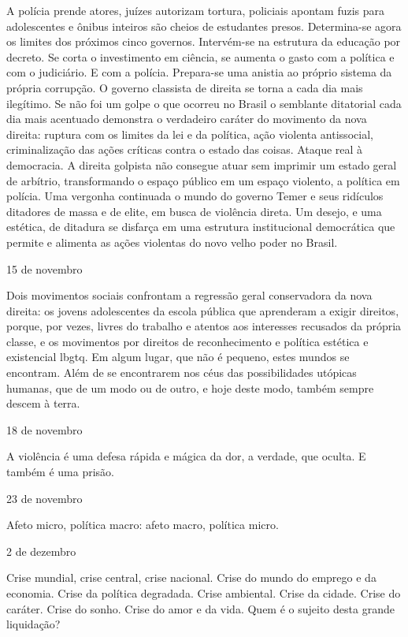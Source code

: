 A polícia prende atores, juízes autorizam tortura, policiais apontam
fuzis para adolescentes e ônibus inteiros são cheios de estudantes
presos. Determina-se agora os limites dos próximos cinco governos.
Intervém-se na estrutura da educação por decreto. Se corta o
investimento em ciência, se aumenta o gasto com a política e com o
judiciário. E com a polícia. Prepara-se uma anistia ao próprio sistema
da própria corrupção. O governo classista de direita se torna a cada dia
mais ilegítimo. Se não foi um golpe o que ocorreu no Brasil o semblante
ditatorial cada dia mais acentuado demonstra o verdadeiro caráter do
movimento da nova direita: ruptura com os limites da lei e da política,
ação violenta antissocial, criminalização das ações críticas contra o
estado das coisas. Ataque real à democracia. A direita golpista não
consegue atuar sem imprimir um estado geral de arbítrio, transformando o
espaço público em um espaço violento, a política em polícia. Uma
vergonha continuada o mundo do governo Temer e seus ridículos ditadores
de massa e de elite, em busca de violência direta. Um desejo, e uma
estética, de ditadura se disfarça em uma estrutura institucional
democrática que permite e alimenta as ações violentas do novo velho
poder no Brasil.

15 de novembro

Dois movimentos sociais confrontam a regressão geral conservadora da
nova direita: os jovens adolescentes da escola pública que aprenderam a
exigir direitos, porque, por vezes, livres do trabalho e atentos aos
interesses recusados da própria classe, e os movimentos por direitos de
reconhecimento e política estética e existencial lbgtq. Em algum lugar,
que não é pequeno, estes mundos se encontram. Além de se encontrarem nos
céus das possibilidades utópicas humanas, que de um modo ou de outro, e
hoje deste modo, também sempre descem à terra.

18 de novembro

A violência é uma defesa rápida e mágica da dor, a verdade, que oculta.
E também é uma prisão.

23 de novembro

Afeto micro, política macro: afeto macro, política micro.

2 de dezembro

Crise mundial, crise central, crise nacional. Crise do mundo do emprego
e da economia. Crise da política degradada. Crise ambiental. Crise da
cidade. Crise do caráter. Crise do sonho. Crise do amor e da vida. Quem
é o sujeito desta grande liquidação?

